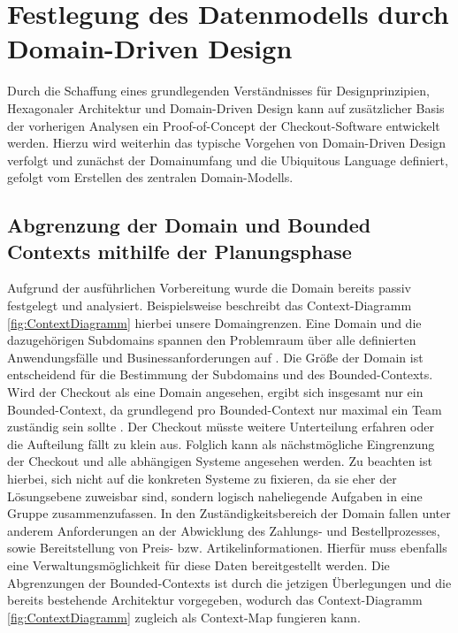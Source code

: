 

\chapter{Festlegung des Datenmodells durch Domain-Driven Design}

Durch die Schaffung eines grundlegenden Verständnisses für Designprinzipien, Hexagonaler Architektur und Domain-Driven Design kann auf zusätzlicher Basis der vorherigen Analysen ein Proof-of-Concept der Checkout-Software entwickelt werden. Hierzu wird weiterhin das typische Vorgehen von Domain-Driven Design verfolgt und zunächst der Domainumfang und die Ubiquitous Language definiert, gefolgt vom Erstellen des zentralen Domain-Modells.

\section{Abgrenzung der Domain und Bounded Contexts mithilfe der Planungsphase}

Aufgrund der ausführlichen Vorbereitung wurde die Domain bereits passiv festgelegt und analysiert. Beispielsweise beschreibt das Context-Diagramm \ref{fig:ContextDiagramm} hierbei unsere Domaingrenzen. Eine Domain und die dazugehörigen Subdomains spannen den Problemraum über alle definierten Anwendungsfälle und Businessanforderungen auf \cite[S. 56]{Vernon.2015}. Die Größe der Domain ist entscheidend für die Bestimmung der Subdomains und des Bounded-Contexts. Wird der Checkout als eine Domain angesehen, ergibt sich insgesamt nur ein Bounded-Context, da grundlegend pro Bounded-Context nur maximal ein Team zuständig sein sollte \cite{Brandolini.2021}. Der Checkout müsste weitere Unterteilung erfahren oder die Aufteilung fällt zu klein aus. Folglich kann als nächstmögliche Eingrenzung der Checkout und alle abhängigen Systeme angesehen werden. Zu beachten ist hierbei, sich nicht auf die konkreten Systeme zu fixieren, da sie eher der Lösungsebene zuweisbar sind, sondern logisch naheliegende Aufgaben in eine Gruppe zusammenzufassen. In den Zuständigkeitsbereich der Domain fallen unter anderem Anforderungen an der Abwicklung des Zahlungs- und Bestellprozesses, sowie Bereitstellung von Preis- bzw. Artikelinformationen. Hierfür muss ebenfalls eine Verwaltungsmöglichkeit für diese Daten bereitgestellt werden. Die Abgrenzungen der Bounded-Contexts ist durch die jetzigen Überlegungen und die bereits bestehende Architektur vorgegeben, wodurch das Context-Diagramm \ref{fig:ContextDiagramm} zugleich als Context-Map fungieren kann.

